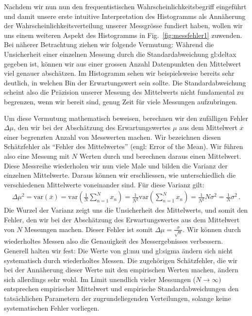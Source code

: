 Nachdem wir nun nun den frequentistischen Wahrscheinlichkeitsbegriff eingeführt und damit unsere erste intuitive Interpretation des Histogramms als Annäherung der Wahrscheinlichkeitsverteilung unserer Messgrösse fundiert haben, wollen wir uns einem weiteren Aspekt des Histogramms in   Fig.~\ref{fig:messfehler1} zuwenden. Bei näherer Betrachtung ziehen wir folgende Vermutung: Während die Unsicherheit einer einzelnen Messung durch die Standardabweichung \gls{gl:deltax} gegeben ist, können wir aus einer grossen Anzahl Datenpunkten den Mittelwert viel genauer abschätzen. Im Histogramm sehen wir beispielsweise bereits sehr deutlich, in welchen Bin der Erwartungswert sein sollte. Die Standardabweichung scheint also die Präzision unserer Messung des Mittelwerts nicht fundamental zu begrenzen, wenn wir bereit sind, genug Zeit für viele Messungen aufzubringen.


Um diese Vermutung mathematisch beweisen, berechnen wir den zufälligen Fehler $\Delta{\mu}$, den wir bei der Abschätzung des Erwartungswertes $\mu$ aus dem Mittelwert $\overline{x}$ einer begrenzten Anzahl von Messwerten machen. Wir bezeichnen diesen Schätzfehler als ``Fehler des Mittelwertes'' (engl: Error of the Mean). Wir führen also eine Messung mit $N$ Werten durch und berechnen daraus einen Mittelwert. Diese Messreihe wiederholen wir nun viele Male und bilden die Varianz der einzelnen Mittelwerte. Daraus können wir erschliessen, wie unterschiedlich die verschiedenen Mittelwerte voneinander sind. Für diese Varianz gilt:
\begin{align}
\Delta{\mu}^2 = \text{var} \left( \overline{x} \right) = \text{var} \left( \frac{1}{N} \sum^N_{n=1} x_n \right) = \frac{1}{N^2} \text{var} \left( \sum^N_{n=1} x_n \right) = \frac{1}{N^2} N \sigma^2 = \frac{1}{N} \sigma^2\,.
\label{eq:vl3-1}
\end{align}
Die Wurzel der Varianz zeigt uns die Unsicherheit des Mittelwerts, und somit den Fehler, den wir bei der Abschätzung des Erwartungswertes aus dem Mittelwert von $N$ Messungen machen.  Dieser Fehler ist somit $\Delta \mu = \frac{ \sigma }{ \sqrt{n} }$. Wir können durch wiederholtes Messen also die Genauigkeit des Messergebnisses verbessern. Generell halten wir fest: Die Werte von \gls{gl:mu} und  \gls{gl:sigma} ändern sich nicht systematisch durch wiederholtes Messen. Die zugehörigen Schätzfehler, die wir bei der Annäherung dieser Werte mit den empirischen Werten machen, ändern sich allerdings sehr wohl. Im Limit unendlich vieler Messungen ($N  \rightarrow  \infty)$ entsprechen empirischer Mittelwert und empirische Standardabweichungen den tatsächlichen Parametern der zugrundeliegenden Verteilungen, solange keine systematischen Fehler vorliegen.

